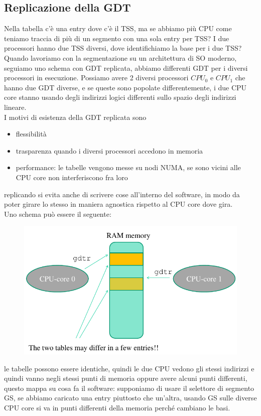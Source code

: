\documentclass[12pt, oneside]{extbook}
\begin{document}
\subsection{Replicazione della GDT}
Nella tabella c'è una entry dove c'è il TSS, ma se abbiamo più CPU come teniamo traccia di più di un segmento con una sola entry per TSS? I due processori hanno due TSS diversi, dove identifichiamo la base per i due TSS? Quando lavoriamo con la segmentazione su un architettura di SO moderno, seguiamo uno schema con GDT replicata, abbiamo differenti GDT per i diversi processori in esecuzione. Possiamo avere 2 diversi processori $CPU_0$ e $CPU_1$ che hanno due GDT diverse, e se queste sono popolate differentemente, i due CPU core stanno usando degli indirizzi logici differenti sullo spazio degli indirizzi lineare.\\ I motivi di esistenza della GDT replicata sono
\begin{itemize}
\item flessibilità
\item trasparenza quando i diversi processori accedono in memoria
\item performance: le tabelle vengono messe su nodi NUMA, se sono vicini alle CPU core non interferiscono fra loro
\end{itemize}
replicando si evita anche di scrivere cose all'interno del software, in modo da poter girare lo stesso in maniera agnostica rispetto al CPU core dove gira.\\ Uno schema può essere il seguente:
\begin{figure}[!h]
	\includegraphics[scale=0.4]{immagini/gdtr_schema1.png}
\end{figure}
le tabelle possono essere identiche, quindi le due CPU vedono gli stessi indirizzi e quindi vanno negli stessi punti di memoria oppure avere alcuni punti differenti, questo mappa su cosa fa il software: supponiamo di usare il selettore di segmento GS, se abbiamo caricato una entry piuttosto che un'altra, usando GS sulle diverse CPU core si va in punti differenti della memoria perché cambiano le basi.
\end{document}
